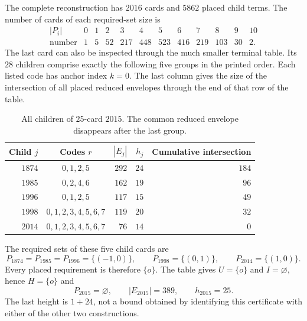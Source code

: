 The complete reconstruction has $2016$ cards and $5862$ placed child
terms.  The number of cards of each required-set size is
\begin{equation}\label{r25:histogram}
\begin{array}{c|rrrrrrrrrrr}
 |P_i|&0&1&2&3&4&5&6&7&8&9&10\\ \hline
 \text{number}&1&5&52&217&448&523&416&219&103&30&2.
\end{array}
\end{equation}
The last card can also be inspected through the much smaller
terminal table.  Its $28$ children comprise exactly the following
five groups in the printed order.  Each listed code has anchor index
$k=0$.  The last column gives the size of the intersection of all
placed reduced envelopes through the end of that row of the table.
\begin{table}[htbp]
\centering
\begin{tabular}{rcrrr}
\toprule
Child $j$&Codes $r$&$|E_j|$&$h_j$&Cumulative intersection\\
\midrule
$1874$&$0,1,2,5$&$292$&$24$&$184$\\
$1985$&$0,2,4,6$&$162$&$19$&$96$\\
$1996$&$0,1,2,5$&$117$&$15$&$49$\\
$1998$&$0,1,2,3,4,5,6,7$&$119$&$20$&$32$\\
$2014$&$0,1,2,3,4,5,6,7$&$76$&$14$&$0$\\
\bottomrule
\end{tabular}
\caption{All children of $25$-card $2015$.  The common reduced
envelope disappears after the last group.}
\label{r25:terminal-table}
\end{table}
The required sets of these five child cards are
\begin{equation}\label{r25:singleton-requirements}
 P_{1874}=P_{1985}=P_{1996}=\{(-1,0)\},\qquad
 P_{1998}=\{(0,1)\},\qquad P_{2014}=\{(1,0)\}.
\end{equation}
Every placed requirement is therefore $\{o\}$.  The table gives
$U=\{o\}$ and $I=\varnothing$, hence $H=\{o\}$ and
\begin{equation}\label{r25:terminal}
 P_{2015}=\varnothing,\qquad |E_{2015}|=389,\qquad h_{2015}=25.
\end{equation}
The last height is $1+24$, not a bound obtained by identifying this
certificate with either of the other two constructions.

